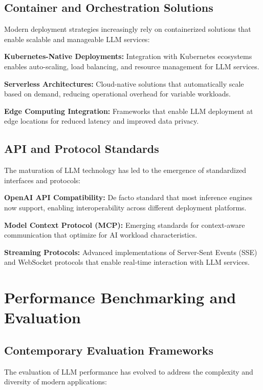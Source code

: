 \subsection{Container and Orchestration Solutions}

Modern deployment strategies increasingly rely on containerized solutions that enable scalable and manageable LLM services:

\textbf{Kubernetes-Native Deployments:} Integration with Kubernetes ecosystems enables auto-scaling, load balancing, and resource management for LLM services.

\textbf{Serverless Architectures:} Cloud-native solutions that automatically scale based on demand, reducing operational overhead for variable workloads.

\textbf{Edge Computing Integration:} Frameworks that enable LLM deployment at edge locations for reduced latency and improved data privacy.

\subsection{API and Protocol Standards}

The maturation of LLM technology has led to the emergence of standardized interfaces and protocols:

\textbf{OpenAI API Compatibility:} De facto standard that most inference engines now support, enabling interoperability across different deployment platforms.

\textbf{Model Context Protocol (MCP):} Emerging standards for context-aware communication that optimize for AI workload characteristics.

\textbf{Streaming Protocols:} Advanced implementations of Server-Sent Events (SSE) and WebSocket protocols \cite{Jhisha2025} that enable real-time interaction with LLM services.

\section{Performance Benchmarking and Evaluation}

\subsection{Contemporary Evaluation Frameworks}

The evaluation of LLM performance has evolved to address the complexity and diversity of modern applications:

